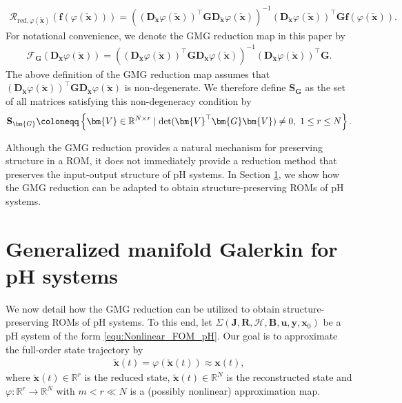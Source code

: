 \documentclass{article}
\newcommand{\bmf}{\bm{f}}
\newcommand{\bmV}{\bm{V}}
\newcommand{\bmB}{\bm{B}}
\newcommand{\bmD}{\bm{D}}
\newcommand{\R}{\mathbb{R}}
\newcommand{\curlyH}{\mathcal{H}}
\newcommand{\statex}{{\bm x}}
\newcommand{\outputy}{{\bm y}}
\newcommand{\stateapprox}{\tilde{\bm x}}
\newcommand{\stateRed}{\check{\bm x}}
\newcommand{\inputu}{\bm{u}}
\newcommand{\SysLable}{\Sigma}
\newcommand{\portsize}{m}
\newcommand{\FOMsize}{N}
\newcommand{\ROMsize}{r}
\newcommand{\approxfunc}{\varphi}
\newcommand{\matset}{\mathbf{S}}
\newcommand{\funcJ}{\bm{J}}
\newcommand{\funcR}{\bm{R}}
\newcommand{\pH}{\textsf{pH}\xspace}
\newcommand{\GMG}{\textsf{GMG}\xspace}
\newcommand{\ROM}{\textsf{ROM}\xspace}
\newcommand{\ROMs}{\textsf{ROM}s\xspace}
\begin{document}
	\begin{align*}
		\mathcal{R}_{\text{red},\approxfunc(\stateRed)} \left(\bmf(\approxfunc(\stateRed))\right) = 	\left( \left(\bmD_{\stateRed}\approxfunc(\stateRed)\right)^{\top} \bm{G}  \bmD_{\stateRed}\approxfunc(\stateRed) \right)^{-1} \left(\bmD_{\stateRed}\approxfunc(\stateRed)\right)^{\top} \bm{G} \bmf(\approxfunc(\stateRed)).
	\end{align*} 
	For notational convenience, we denote the \GMG reduction map in this paper by 
	\begin{align}
	\label{equ:GMG_redu_map}
		\mathcal{F}_{\bm{G}} \left(\bmD_{\stateRed}\approxfunc(\stateRed) \right) = 	\left( \left(\bmD_{\stateRed}\approxfunc(\stateRed)\right)^{\top} \bm{G}  \bmD_{\stateRed}\approxfunc(\stateRed) \right)^{-1} \left(\bmD_{\stateRed}\approxfunc(\stateRed)\right)^{\top} \bm{G}. 
	\end{align}
	The above definition of the \GMG reduction map assumes that $\left(\bmD_{\stateRed}\approxfunc(\stateRed)\right)^{\top} \bm{G} \bmD_{\stateRed}\approxfunc(\stateRed)$ is non-degenerate. We therefore define $\matset_{\bm{G}}$ as the set of all matrices satisfying this non-degeneracy condition by 
	\begin{align}
		\label{equ:mat_set_defi}
		\matset_{\bm{G}}\coloneqq \left\{ \bmV\in\R^{\FOMsize\times \ROMsize} \mid {\rm det}(\bmV^{\top} \bm{G} \bmV)\neq 0,\  1\leq\ROMsize\leq\FOMsize \right\}.
	\end{align}
	
	Although the \GMG reduction provides a natural mechanism for preserving structure in a \ROM, it does not immediately provide a reduction method that preserves the input-output structure of \pH systems. In Section \ref{Sec:GMG_reduction}, we show how the \GMG reduction can be adapted to obtain structure-preserving \ROMs of \pH systems.

	
\section{Generalized manifold Galerkin for \pH systems}
\label{Sec:GMG_reduction}	
We now detail how the \GMG reduction can be utilized to obtain structure-preserving \ROMs of \pH systems. 
To this end, let $\SysLable(\funcJ,\funcR,\curlyH,\bmB, \inputu,\outputy,\statex_0)$ be a \pH system of the form \eqref{equ:Nonlinear_FOM_pH}. Our goal is to approximate the full-order state trajectory by %
\begin{align}
\label{equ:nonlinear_approximation}
	\stateapprox(t)=\approxfunc(\stateRed(t)) \approx \statex(t),
\end{align}
where $\stateRed(t) \in\R^{\ROMsize}$ is the reduced state, $\stateapprox(t) \in\R^{\FOMsize}$ is the reconstructed state and $\approxfunc\colon\R^{\ROMsize}\rightarrow\R^{\FOMsize}$ with $\portsize<\ROMsize\ll \FOMsize$ is a (possibly nonlinear) approximation map. 
								
\end{document}
